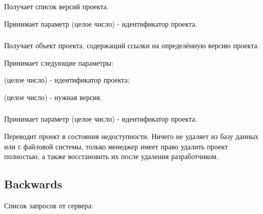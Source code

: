 \subsubsection{}

Получает список версий проекта.

Принимает параметр  (целое число) - идентификатор проекта.

\subsubsection{}

Получает объект проекта, содержащий ссылки на определённую версию проекта.

Принимает следующие параметры:

\begin{icItems}
	\item {} (целое число) - идентификатор проекта;
	\item {} (целое число) - нужная версия.
\end{icItems}

\subsubsection{}

Принимает параметр  (целое число) - идентификатор проекта.

Переводит проект в состояния недоступности. Ничего не удаляет из базу данных или с файловой системы, только менеджер имеет право удалить проект полностью, а также восстановить их после удаления разработчиком.

\subsection{Backwards}

Список запросов от сервера:
\begin{icItems}
	\item {}
	\item {}
	\item {}
	\item {}
	\item {}
\end{icItems}

\subsubsection{}

